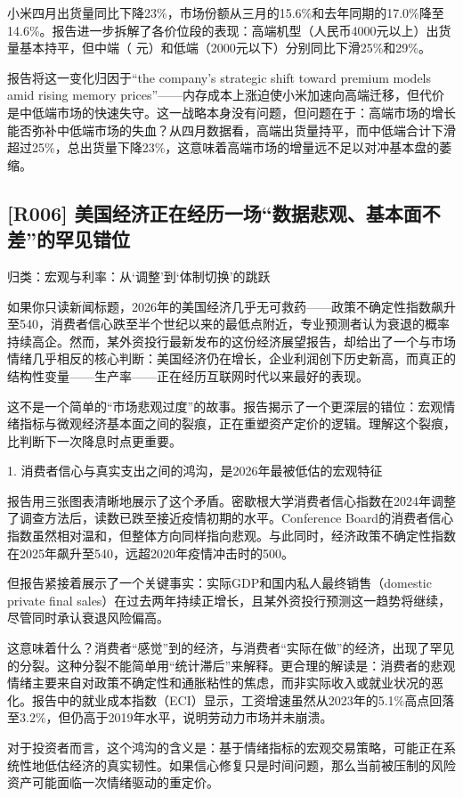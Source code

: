 \documentclass[11pt]{ctexart}
\begin{document}
小米四月出货量同比下降23\%，市场份额从三月的15.6\%和去年同期的17.0\%降至14.6\%。报告进一步拆解了各价位段的表现：高端机型（人民币4000元以上）出货量基本持平，但中端（ 元）和低端（2000元以下）分别同比下滑25\%和29\%。

报告将这一变化归因于“the company's strategic shift toward premium models amid rising memory prices”——内存成本上涨迫使小米加速向高端迁移，但代价是中低端市场的快速失守。这一战略本身没有问题，但问题在于：高端市场的增长能否弥补中低端市场的失血？从四月数据看，高端出货量持平，而中低端合计下滑超过25\%，总出货量下降23\%，这意味着高端市场的增量远不足以对冲基本盘的萎缩。

\subsection{[R006] 美国经济正在经历一场“数据悲观、基本面不差”的罕见错位}
{\small\color{refgray}归类：宏观与利率：从‘调整’到‘体制切换’的跳跃}

如果你只读新闻标题，2026年的美国经济几乎无可救药——政策不确定性指数飙升至540，消费者信心跌至半个世纪以来的最低点附近，专业预测者认为衰退的概率持续高企。然而，某外资投行最新发布的这份经济展望报告，却给出了一个与市场情绪几乎相反的核心判断：美国经济仍在增长，企业利润创下历史新高，而真正的结构性变量——生产率——正在经历互联网时代以来最好的表现。

这不是一个简单的“市场悲观过度”的故事。报告揭示了一个更深层的错位：宏观情绪指标与微观经济基本面之间的裂痕，正在重塑资产定价的逻辑。理解这个裂痕，比判断下一次降息时点更重要。

1. 消费者信心与真实支出之间的鸿沟，是2026年最被低估的宏观特征

报告用三张图表清晰地展示了这个矛盾。密歇根大学消费者信心指数在2024年调整了调查方法后，读数已跌至接近疫情初期的水平。Conference Board的消费者信心指数虽然相对温和，但整体方向同样指向悲观。与此同时，经济政策不确定性指数在2025年飙升至540，远超2020年疫情冲击时的500。

但报告紧接着展示了一个关键事实：实际GDP和国内私人最终销售（domestic private final sales）在过去两年持续正增长，且某外资投行预测这一趋势将继续，尽管同时承认衰退风险偏高。

这意味着什么？消费者“感觉”到的经济，与消费者“实际在做”的经济，出现了罕见的分裂。这种分裂不能简单用“统计滞后”来解释。更合理的解读是：消费者的悲观情绪主要来自对政策不确定性和通胀粘性的焦虑，而非实际收入或就业状况的恶化。报告中的就业成本指数（ECI）显示，工资增速虽然从2023年的5.1\%高点回落至3.2\%，但仍高于2019年水平，说明劳动力市场并未崩溃。

对于投资者而言，这个鸿沟的含义是：基于情绪指标的宏观交易策略，可能正在系统性地低估经济的真实韧性。如果信心修复只是时间问题，那么当前被压制的风险资产可能面临一次情绪驱动的重定价。
\end{document}
